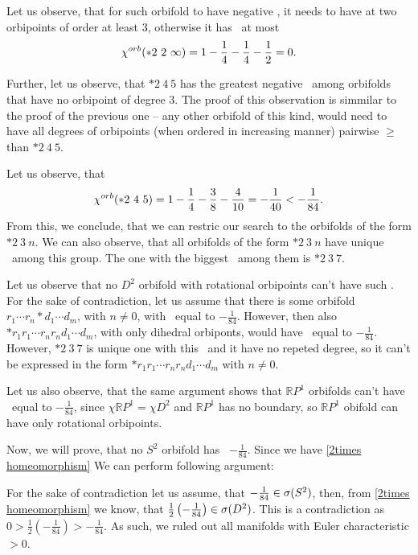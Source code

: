 Let us observe, that for such orbifold to have negative \Eoc, it needs to have at two orbipoints 
of order at least $3$, otherwise it has \Eoc\ at most 
\begin{equation}
\cho{*2\ 2\ \infty} = 1- \frac{1}{4} - \frac{1}{4} - \frac{1}{2} = 0. 
\end{equation}

Further, let us observe, that $*2\ 4\ 5$ has the greatest negative \Eoc\ among orbifolds 
that have no orbipoint of degree $3$. The proof of this observation is simmilar to the proof 
of the previous one -- any other orbifold of this kind, 
would need to have all degrees of orbipoints (when ordered in increasing manner) 
pairwise $\geq$ than $*2\ 4\ 5$.

Let us observe, that
\begin{equation}
{\chi^{orb}(*2\ 4\ 5)} = 1 - \frac{1}{4} - \frac{3}{8} - \frac{4}{10} = -\frac{1}{40} < - \frac{1}{84}. 
\end{equation}
From this, we conclude, that we can restric our search to the orbifolds of 
the form $*2\ 3\ n$. 
We can also observe, that all orbifolds of the form $*2\ 3\ n$ have unique \Eoc\ 
among this group.
The one with the biggest \Eoc\ among them is $*2\ 3\ 7$. 

Let us observe that no $D^2$ orbifold with rotational orbipoints can't have such \Eoc. 
For the sake of contradiction, let us assume that there is some orbifold 
$r_1 \cdots r_n * d_1 \cdots d_m$, with $n\neq 0$, with \Eoc\ equal to $-\frac{1}{84}$. 
However, then also $*r_1r_1 \cdots r_nr_nd_1\cdots d_m$, 
with only dihedral orbiponts, 
would have \Eoc\ equal to $-\frac{1}{84}$. However, $*2\ 3\ 7$ is unique one with this \Eoc\ 
and it have no repeted degree, so it can't be expressed in the form 
$*r_1r_1 \cdots r_nr_nd_1\cdots d_m$ 
with $n\neq 0$. 

Let us also observe, that the same argument shows that $\mathbb{R}P^1$ orbifolds 
can't have \Eoc\ equal to $-\frac{1}{84}$, since $\chi{\mathbb{R}P^1} = \chi{D^2}$ 
and $\mathbb{R}P^1$ has no boundary, so $\mathbb{R}P^1$ obifold can have only rotational 
orbipoints. 
 
Now, we will prove, that no $S^2$ orbifold has \Eoc\ $-\frac{1}{84}$. 
Since we have \ref{2times homeomorphism} 
We can perform following argument:  
 
For the sake of contradiction let us assume, that 
$-\frac{1}{84} \in {{\sigma}(S^2)}$, then, from \ref{2times homeomorphism} we know, that 
$\frac{1}{2}\left(-\frac{1}{84}\right)\in {{\sigma}(D^2)}$. This is a contradiction as 
$0 > \frac{1}{2}\left(-\frac{1}{84}\right) > -\frac{1}{84}$. 
As such, we ruled out all manifolds with Euler characteristic $>0$. 

